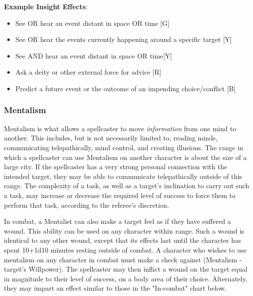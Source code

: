 \documentclass[oneside]{book}
\begin{document}
\begin{multicols}{2}
\textbf{Example Insight Effects}:
	\begin{itemize}
		\setlength{\itemsep}{0cm}%
  		\setlength{\parskip}{0cm}%
		\item{ \small See OR hear an event distant in space OR time [G]}
		\item{ \small See OR hear the events currently happening around a specific target [Y]}
		\item{ \small See AND hear an event distant in space OR time[Y]}
		\item{ \small Ask a deity or other external force for advice [R]}
		\item{ \small Predict a future event or the outcome of an impending choice/conflict [B]}
	\end{itemize}

\subsubsection{Mentalism}
Mentalism is what allows a spellcaster to move \emph{information} from one mind to another. This includes, but is not necessarily limited to, reading minds, communicating telepathically, mind control, and creating illusions. The range in which a spellcaster can use Mentalism on another character is about the size of a large city. If the spellcaster has a very strong personal connection with the intended target, they may be able to communicate telepathically outside of this range. The complexity of a task, as well as a target's inclination to carry out such a task, may increase or decrease the required level of success to force them to perform that task, according to the referee's discretion.

In combat, a Mentalist can also make a target feel as if they have suffered a wound. This ability can be used on any character within range. Such a wound is identical to any other wound, except that its effects last until the character has spent 10+1d10 minutes resting outside of combat. A character who wishes to use mentalism on any character in combat must make a check against (Mentalism - target's Willpower). The spellcaster may then inflict a wound on the target equal in magnitude to their level of success, on a body area of their choice. Alternately, they may impart an effect similar to those in the "In-combat" chart below.  


\end{multicols}
\end{document}
